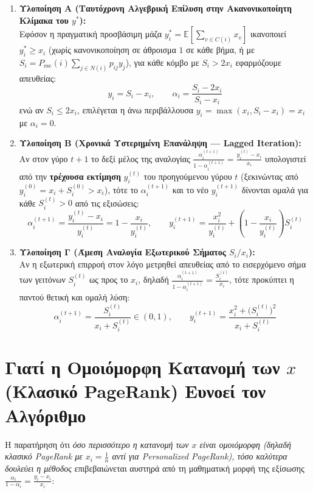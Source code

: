 \documentclass[11pt, a4paper]{article}
\begin{document}
\begin{enumerate}
    \item \textbf{Υλοποίηση Α (Ταυτόχρονη Αλγεβρική Επίλυση στην Ακανονικοποίητη Κλίμακα του $y^*$):} \\
    Εφόσον η πραγματική προσβάσιμη μάζα $y^*_i = \mathbb{E}[\sum_{v \in C(i)} x_v]$ ικανοποιεί $y^*_i \ge x_i$ (χωρίς κανονικοποίηση σε άθροισμα $1$ σε κάθε βήμα, ή με $S_i = P_{\mathrm{esc}}(i) \sum_{j \in N(i)} p_{ij} y_j$), για κάθε κόμβο με $S_i > 2x_i$ εφαρμόζουμε απευθείας:
    \[
    y_i = S_i - x_i, \qquad \alpha_i = \frac{S_i - 2x_i}{S_i - x_i}
    \]
    ενώ αν $S_i \le 2x_i$, επιλέγεται η άνω περιβάλλουσα $y_i = \max(x_i, S_i - x_i) = x_i$ με $\alpha_i = 0$.

    \item \textbf{Υλοποίηση Β (Χρονικά Υστερημένη Επανάληψη --- Lagged Iteration):} \\
    Αν στον γύρο $t+1$ το δεξί μέλος της αναλογίας $\frac{\alpha_i^{(t+1)}}{1 - \alpha_i^{(t+1)}} = \frac{y_i^{(t)} - x_i}{x_i}$ υπολογιστεί από την \textbf{τρέχουσα εκτίμηση} $y_i^{(t)}$ του προηγούμενου γύρου $t$ (ξεκινώντας από $y_i^{(0)} = x_i + S_i^{(0)} > x_i$), τότε το $\alpha_i^{(t+1)}$ και το νέο $y_i^{(t+1)}$ δίνονται ομαλά για κάθε $S_i^{(t)} > 0$ από τις εξισώσεις:
    \[
    \boxed{\;\alpha_i^{(t+1)} = \frac{y_i^{(t)} - x_i}{y_i^{(t)}} = 1 - \frac{x_i}{y_i^{(t)}}, \qquad y_i^{(t+1)} = \frac{x_i^2}{y_i^{(t)}} + \left(1 - \frac{x_i}{y_i^{(t)}}\right) S_i^{(t)}\;}
    \]

    \item \textbf{Υλοποίηση Γ (Άμεση Αναλογία Εξωτερικού Σήματος $S_i / x_i$):} \\
    Αν η εξωτερική επιρροή στον λόγο μετρηθεί απευθείας από το εισερχόμενο σήμα των γειτόνων $S_i^{(t)}$ ως προς το $x_i$, δηλαδή $\frac{\alpha_i^{(t+1)}}{1 - \alpha_i^{(t+1)}} = \frac{S_i^{(t)}}{x_i}$, τότε προκύπτει η παντού θετική και ομαλή λύση:
    \[
    \boxed{\;\alpha_i^{(t+1)} = \frac{S_i^{(t)}}{x_i + S_i^{(t)}} \in (0,1), \qquad y_i^{(t+1)} = \frac{x_i^2 + \big(S_i^{(t)}\big)^2}{x_i + S_i^{(t)}}\;}
    \]
\end{enumerate}

\section{Γιατί η Ομοιόμορφη Κατανομή των $x$ (Κλασικό PageRank) Ευνοεί τον Αλγόριθμο}

Η παρατήρηση ότι \textit{όσο περισσότερο η κατανομή των $x$ είναι ομοιόμορφη (δηλαδή κλασικό PageRank με $x_i = \frac{1}{n}$ αντί για Personalized PageRank), τόσο καλύτερα δουλεύει η μέθοδος} επιβεβαιώνεται αυστηρά από τη μαθηματική μορφή της εξίσωσης $\frac{\alpha_i}{1 - \alpha_i} = \frac{y_i - x_i}{x_i}$:
\end{document}
